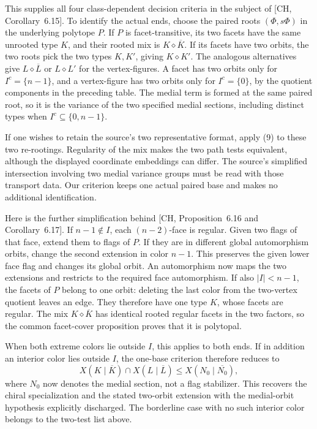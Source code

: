 \documentclass[a4paper,11pt]{article}
\newcommand{\mix}{\mathbin{\diamond}}\newcommand{\Alt}{\operatorname{Alt}}
\begin{document}
This supplies all four class-dependent decision criteria in the subject
of [CH, Corollary~6.15]. To identify the actual ends, choose the paired
roots $(\Phi,s\Phi)$ in the underlying polytope $P$. If $P$ is
facet-transitive, its two facets have the same unrooted type $K$, and
their rooted mix is $K\mix\overline K$. If its facets have two
orbits, the two roots pick the two types $K,K'$, giving $K\mix K'$.
The analogous alternatives give $L\mix\overline L$ or $L\mix L'$
for the vertex-figures. A facet has two orbits only for
$I^c=\{n-1\}$, and a vertex-figure has two orbits only for
$I^c=\{0\}$, by the quotient components in the preceding table.
The medial term is formed at the same paired root, so it is the
variance of the two specified medial sections, including distinct
types when $I^c\subseteq\{0,n-1\}$.

If one wishes to retain the source's two representative format, apply
(9) to these two re-rootings. Regularity of the mix makes the two
path tests equivalent, although the displayed coordinate embeddings
can differ. The source's simplified intersection involving two medial
variance groups must be read with those transport data. Our criterion
keeps one actual paired base and makes no additional identification.

Here is the further simplification behind [CH, Proposition~6.16 and
Corollary~6.17]. If $n-1\notin I$, each $(n-2)$-face is regular.
Given two flags of that face, extend them to flags of $P$. If they are
in different global automorphism orbits, change the second extension
in color $n-1$. This preserves the given lower face flag and changes
its global orbit. An automorphism now maps the two extensions and
restricts to the required face automorphism. If also $|I|<n-1$, the
facets of $P$ belong to one orbit: deleting the last color from the
two-vertex quotient leaves an edge. They therefore have one type $K$,
whose facets are regular. The mix $K\mix\overline K$ has identical
rooted regular facets in the two factors, so the common facet-cover
proposition proves that it is polytopal.

When both extreme colors lie outside $I$, this applies to both ends.
If in addition an interior color lies outside $I$, the one-base criterion
therefore reduces to
\[
 X(K\mid\overline K)\cap X(L\mid\overline L)
 \leq X(N_0\mid\overline{N_0}),
\]
where $N_0$ now denotes the medial section, not a flag stabilizer.
This recovers the chiral specialization and the stated two-orbit extension
with the medial-orbit hypothesis explicitly discharged. The borderline
case with no such interior color belongs to the two-test list above.
\end{document}
